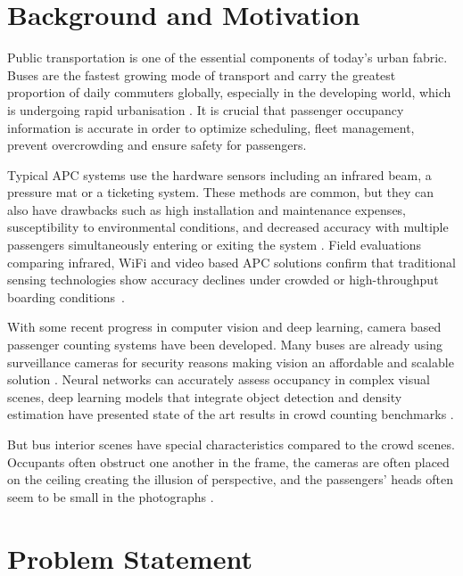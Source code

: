 
\section{Background and Motivation}

Public transportation is one of the essential components of today's urban fabric. Buses are the fastest growing mode of transport and carry the greatest proportion of daily commuters globally, especially in the developing world, which is undergoing rapid urbanisation \cite{itf_outlook_2023}. It is crucial that passenger occupancy information is accurate in order to optimize scheduling, fleet management, prevent overcrowding and ensure safety for passengers.

Typical APC systems use the hardware sensors including an infrared beam, a pressure mat or a ticketing system. These methods are common, but they can also have drawbacks such as high installation and maintenance expenses, susceptibility to environmental conditions, and decreased accuracy with multiple passengers simultaneously entering or exiting the system \cite{Chris2024}. Field evaluations comparing infrared, WiFi and video based APC solutions confirm that traditional sensing technologies show accuracy declines under crowded or high-throughput boarding conditions~\cite{grgurevic2021review}.

With some recent progress in computer vision and deep learning, camera based passenger counting systems have been developed. Many buses are already using surveillance cameras for security reasons making vision an affordable and scalable solution \cite{Chris2023}. Neural networks can accurately assess occupancy in complex visual scenes, deep learning models that integrate object detection and density estimation have presented state of the art results in crowd counting benchmarks \cite{gao2022caaisurvey}.

But bus interior scenes have special characteristics compared to the crowd scenes. Occupants often obstruct one another in the frame, the cameras are often placed on the ceiling creating the illusion of perspective, and the passengers' heads often seem to be small in the photographs \cite{tezcan2024fisheye}.

\section{Problem Statement}


